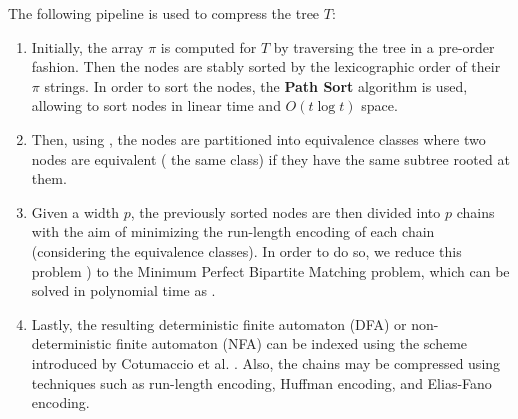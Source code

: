 The following pipeline is used to compress the tree $T$:
\begin{enumerate}
    \item Initially, the array $\pi$ is computed for  $T$ by traversing the tree in a pre-order fashion. Then the nodes are stably sorted by the lexicographic order of their $\pi$ strings. In order to sort the nodes, the \textbf{Path Sort} algorithm   is used, allowing to sort nodes in linear time and $O(t \log t)$ space.   
    \item Then, using  , the nodes are partitioned into equivalence classes where two nodes are equivalent ( the same class) if they have the same subtree rooted at them.
    \item Given a width $p$, the previously sorted nodes are then divided into $p$ chains with the aim of minimizing the run-length encoding of each chain (considering the equivalence classes). In order to do so, we reduce this problem  ) to the Minimum Perfect Bipartite Matching problem, which can be solved in polynomial time as .
    \item Lastly, the resulting deterministic finite automaton (DFA) or non-deterministic finite automaton (NFA) can be indexed using the  scheme introduced by Cotumaccio et al. \cite{cotumaccio2023co}. Also, the chains may be compressed using  techniques such as run-length encoding, Huffman encoding, and Elias-Fano encoding.
\end{enumerate}